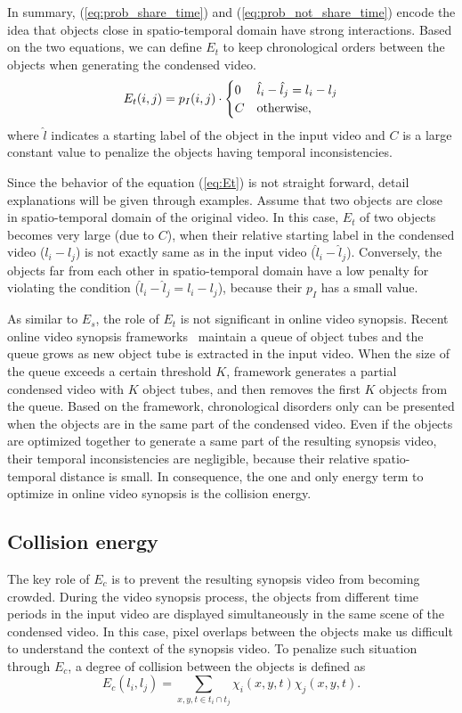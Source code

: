 \documentclass[11pt]{hyu_thesis}
\begin{document}
In summary, (\ref{eq:prob_share_time}) and (\ref{eq:prob_not_share_time}) encode the idea that objects close in spatio-temporal domain have strong interactions. Based on the two equations, we can define $E_t$ to keep chronological orders between the objects when generating the condensed video.
\begin{equation}
\label{eq:Et}
E_t(i,j)=
p_I(i, j) \cdot
\begin{cases}
0 & \hat{l}_i - \hat{l}_j = l_i - l_j \\
C & \rm{otherwise},
\end{cases}
\end{equation}
where $\hat{l}$ indicates a starting label of the object in the input video and $C$ is a large constant value to penalize the objects having temporal inconsistencies. 

Since the behavior of the equation (\ref{eq:Et}) is not straight forward, detail explanations will be given through examples. Assume that two objects are close in spatio-temporal domain of the original video. In this case, $E_t$ of two objects becomes very large (due to $C$), when their relative starting label in the condensed video ($l_i - l_j$) is not exactly same as in the input video ($\hat{l}_i - \hat{l}_j$). Conversely, the objects far from each other in spatio-temporal domain have a low penalty for violating the condition ($\hat{l}_i - \hat{l}_j = l_i - l_j$), because their $p_I$ has a small value.

As similar to $E_s$, the role of $E_t$ is not significant in online video synopsis. Recent online video synopsis frameworks~\cite{} maintain a queue of object tubes and the queue grows as new object tube is extracted in the input video. When the size of the queue exceeds a certain threshold $K$, framework generates a partial condensed video with $K$ object tubes, and then removes the first $K$ objects from the queue. Based on the framework, chronological disorders only can be presented when the objects are in the same part of the condensed video. Even if the objects are optimized together to generate a same part of the resulting synopsis video, their temporal inconsistencies are negligible, because their relative spatio-temporal distance is small. In consequence, the one and only energy term to optimize in online video synopsis is the collision energy.

\subsection{Collision energy}
The key role of $E_c$ is to prevent the resulting synopsis video from becoming crowded. During the video synopsis process, the objects from different time periods in the input video are displayed simultaneously in the same scene of the condensed video. In this case, pixel overlaps between the objects make us difficult to understand the context of the synopsis video. To penalize such situation through $E_c$, a degree of collision between the objects is defined as
\begin{equation}
\label{eq:Ec}
E_c(l_i,l_j)=\sum_{x,y,t \in t_i \cap t_j} \chi_i(x,y,t) \chi_j(x,y,t).
\end{equation}
\end{document}
